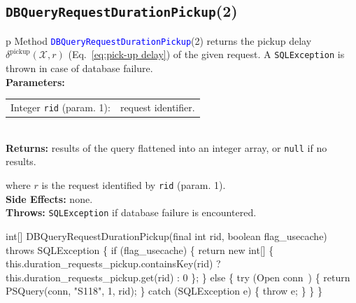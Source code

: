 \subsection{\texttt{DBQueryRequestDurationPickup}(2)}
\begin{tabular}{p{\textwidth}}
\toprule
{}
Method \textcolor{blue}{{\tt{}\protect{}DBQueryRequestDurationPickup}}(2) returns the
pickup delay $\delta^\textrm{pickup}(\mathcal{X},r)$
(Eq.~\ref{eq:pick-up delay}) of the given request.
A {\tt{}SQLException} is thrown in case of database failure.\\
\midrule
\textbf{Parameters:}\\
\begin{tabular}{lp{116mm}}
Integer {\tt{}rid} (param. 1):&request identifier.
\end{tabular}\\
\textbf{Returns:} results of the query flattened into an integer array,
or {\tt{}null} if no results.


where $r$ is the request identified by {\tt{}rid} (param. 1).\\
\textbf{Side Effects:} none.\\
\textbf{Throws:} {\tt{}SQLException} if database failure is encountered.\\
\bottomrule
\end{tabular}
\nwenddocs{}\endmoddef{}
int[] DBQueryRequestDurationPickup(final int rid, boolean flag_usecache) throws SQLException \{
  if (flag_usecache) \{
    return new int[] \{ this.duration_requests_pickup.containsKey(rid)
        ? this.duration_requests_pickup.get(rid)
        : 0 \};
  \} else \{
    try (\LA{}Open \code{}conn\edoc{}~{\nwtagstyle{}}\RA{}) \{
      return PSQuery(conn, "S118", 1, rid);
    \} catch (SQLException e) \{
      throw e;
    \}
  \}
\}
\eatline
{}\nwendcode{}\nwdocspar
